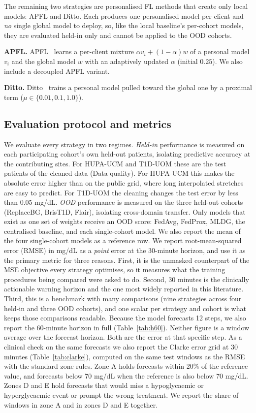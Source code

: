 \documentclass[10pt,letterpaper]{article}
\begin{document}
The remaining two strategies are personalised FL methods that create only
local models: APFL and Ditto. Each produces one personalised model per client
and \emph{no} single global model to deploy, so, like the local baseline's
per-cohort models, they are evaluated held-in only and cannot be applied to
the OOD cohorts.

\textbf{APFL.} APFL~\cite{deng2020apfl} learns a per-client
mixture $\alpha v_i + (1-\alpha)w$ of a personal model $v_i$ and the global
model $w$ with an adaptively updated $\alpha$ (initial $0.25$). We also include
a decoupled APFL variant.

\textbf{Ditto.} Ditto~\cite{li2021ditto} trains a personal model
pulled toward the global one by a proximal term ($\mu\in\{0.01,0.1,1.0\}$).

\subsection*{Evaluation protocol and metrics}

We evaluate every strategy in two regimes. \emph{Held-in} performance is measured
on each participating cohort's own held-out patients, isolating predictive
accuracy at the contributing sites. For HUPA-UCM and T1D-UOM these are the
test patients of the cleaned data (Data quality). For HUPA-UCM this makes the
absolute error higher than on the public grid, where long interpolated
stretches are easy to predict. For T1D-UOM the cleaning changes the test error
by less than $0.05$ mg/dL. \emph{OOD} performance is measured on the
three held-out cohorts (ReplaceBG, BrisT1D, Flair), isolating cross-domain
transfer. Only models that exist as one set of weights receive an OOD score:
FedAvg, FedProx, MLDG, the centralised baseline, and each single-cohort
model. We also report the mean of the four single-cohort models as a
reference row.
We report root-mean-squared error (RMSE) in mg/dL as a \emph{point} error at the
30-minute horizon, and use it as the primary metric for three reasons.
First, it is the unmasked counterpart of the MSE objective every strategy
optimises, so it measures what the training procedures being compared were
asked to do.
Second, 30 minutes is the clinically actionable warning horizon and the one most
widely reported in this literature. Third, this is a benchmark with many
comparisons (nine strategies across four held-in and three OOD cohorts), and
one scalar per strategy and cohort is what keeps those comparisons readable. Because the model
forecasts 12 steps, we also report the 60-minute horizon in full
(Table~\ref{tab:h60}). Neither figure is a window average
over the forecast horizon. Both are the error at that specific step.
As a clinical check on the same forecasts we also report the Clarke error
grid \cite{clarke1987} at 30 minutes (Table~\ref{tab:clarke}), computed on
the same test windows as the RMSE with the standard zone rules. Zone A holds
forecasts within $20\%$ of the reference value, and forecasts below 70 mg/dL
when the reference is also below 70 mg/dL. Zones D and E hold forecasts that
would miss a hypoglycaemic or hyperglycaemic event or prompt the wrong
treatment. We report the share of windows in zone A and in zones D and E
together.
\end{document}
